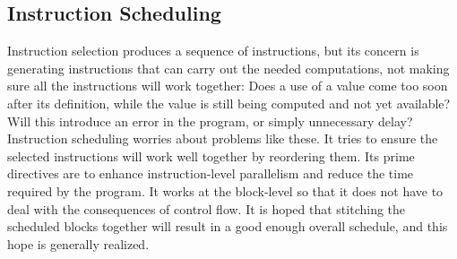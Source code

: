 \subsection{Instruction Scheduling}
Instruction selection produces a sequence of instructions, but its concern is generating instructions that can carry out the needed computations, not making sure all the instructions will work together: Does a use of a value come too soon after its definition, while the value is still being computed and not yet available? Will this introduce an error in the program, or simply unnecessary delay? Instruction scheduling worries about problems like these. It tries to ensure the selected instructions will work well together by reordering them. Its prime directives are to enhance instruction-level parallelism and reduce the time required by the program. It works at the block-level so that it does not have to deal with the consequences of control flow. It is hoped that stitching the scheduled blocks together will result in a good enough overall schedule, and this hope is generally realized.

